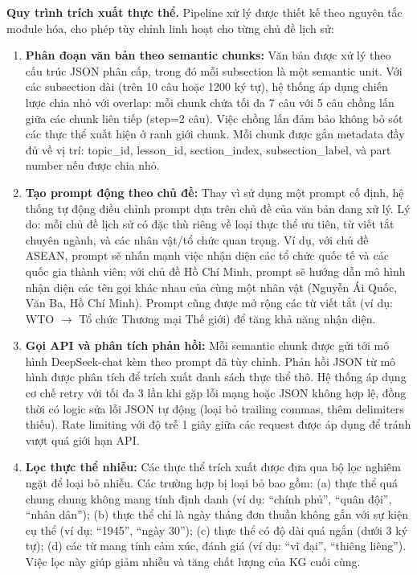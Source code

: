 \vspace{0.5em}
\noindent\textbf{Quy trình trích xuất thực thể.}
Pipeline xử lý được thiết kế theo nguyên tắc module hóa, cho phép tùy chỉnh linh hoạt cho từng chủ đề lịch sử:

\begin{enumerate}
    \item \textbf{Phân đoạn văn bản theo semantic chunks:} Văn bản được xử lý theo cấu trúc JSON phân cấp, trong đó mỗi subsection là một semantic unit. Với các subsection dài (trên 10 câu hoặc 1200 ký tự), hệ thống áp dụng chiến lược chia nhỏ với overlap: mỗi chunk chứa tối đa 7 câu với 5 câu chồng lấn giữa các chunk liên tiếp (step=2 câu). Việc chồng lấn đảm bảo không bỏ sót các thực thể xuất hiện ở ranh giới chunk. Mỗi chunk được gắn metadata đầy đủ về vị trí: topic\_id, lesson\_id, section\_index, subsection\_label, và part number nếu được chia nhỏ.

    \item \textbf{Tạo prompt động theo chủ đề:} Thay vì sử dụng một prompt cố định, hệ thống tự động điều chỉnh prompt dựa trên chủ đề của văn bản đang xử lý. Lý do: mỗi chủ đề lịch sử có đặc thù riêng về loại thực thể ưu tiên, từ viết tắt chuyên ngành, và các nhân vật/tổ chức quan trọng. Ví dụ, với chủ đề ASEAN, prompt sẽ nhấn mạnh việc nhận diện các tổ chức quốc tế và các quốc gia thành viên; với chủ đề Hồ Chí Minh, prompt sẽ hướng dẫn mô hình nhận diện các tên gọi khác nhau của cùng một nhân vật (Nguyễn Ái Quốc, Văn Ba, Hồ Chí Minh). Prompt cũng được mở rộng các từ viết tắt (ví dụ: WTO $\rightarrow$ Tổ chức Thương mại Thế giới) để tăng khả năng nhận diện.

    \item \textbf{Gọi API và phân tích phản hồi:} Mỗi semantic chunk được gửi tới mô hình DeepSeek-chat kèm theo prompt đã tùy chỉnh. Phản hồi JSON từ mô hình được phân tích để trích xuất danh sách thực thể thô. Hệ thống áp dụng cơ chế retry với tối đa 3 lần khi gặp lỗi mạng hoặc JSON không hợp lệ, đồng thời có logic sửa lỗi JSON tự động (loại bỏ trailing commas, thêm delimiters thiếu). Rate limiting với độ trễ 1 giây giữa các request được áp dụng để tránh vượt quá giới hạn API.

    \item \textbf{Lọc thực thể nhiễu:} Các thực thể trích xuất được đưa qua bộ lọc nghiêm ngặt để loại bỏ nhiễu. Các trường hợp bị loại bỏ bao gồm: (a) thực thể quá chung chung không mang tính định danh (ví dụ: ``chính phủ'', ``quân đội'', ``nhân dân''); (b) thực thể chỉ là ngày tháng đơn thuần không gắn với sự kiện cụ thể (ví dụ: ``1945'', ``ngày 30''); (c) thực thể có độ dài quá ngắn (dưới 3 ký tự); (d) các từ mang tính cảm xúc, đánh giá (ví dụ: ``vĩ đại'', ``thiêng liêng''). Việc lọc này giúp giảm nhiễu và tăng chất lượng của KG cuối cùng.


\end{enumerate}
